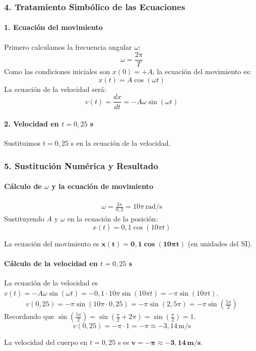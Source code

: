 \subsubsection*{4. Tratamiento Simbólico de las Ecuaciones}
\paragraph*{1. Ecuación del movimiento}
Primero calculamos la frecuencia angular $\omega$:
$$\omega = \frac{2\pi}{T}$$
Como las condiciones iniciales son $x(0)=+A$, la ecuación del movimiento es:
$$x(t) = A \cos(\omega t)$$
La ecuación de la velocidad será:
$$v(t) = \frac{dx}{dt} = -A\omega \sin(\omega t)$$

\paragraph*{2. Velocidad en $t=0,25$ s}
Sustituimos $t=0,25$ s en la ecuación de la velocidad.

\subsubsection*{5. Sustitución Numérica y Resultado}
\paragraph*{Cálculo de $\omega$ y la ecuación de movimiento}
\begin{gather}
    \omega = \frac{2\pi}{0,2} = 10\pi \, \text{rad/s}
\end{gather}
Sustituyendo $A$ y $\omega$ en la ecuación de la posición:
$$x(t) = 0,1 \cos(10\pi t)$$
\begin{cajaresultado}
    La ecuación del movimiento es $\boldsymbol{x(t) = 0,1 \cos(10\pi t)}$ (en unidades del SI).
\end{cajaresultado}

\paragraph*{Cálculo de la velocidad en $t=0,25$ s}
La ecuación de la velocidad es $v(t) = -A\omega \sin(\omega t) = -0,1 \cdot 10\pi \sin(10\pi t) = -\pi \sin(10\pi t)$.
\begin{gather}
    v(0,25) = -\pi \sin(10\pi \cdot 0,25) = -\pi \sin(2,5\pi) = -\pi \sin(\frac{5\pi}{2})
\end{gather}
Recordando que $\sin(\frac{5\pi}{2}) = \sin(\frac{\pi}{2} + 2\pi) = \sin(\frac{\pi}{2}) = 1$.
$$v(0,25) = -\pi \cdot 1 = -\pi \approx -3,14 \, \text{m/s}$$
\begin{cajaresultado}
    La velocidad del cuerpo en $t=0,25$ s es $\boldsymbol{v = -\pi \approx -3,14 \, \textbf{m/s}}$.
\end{cajaresultado}

